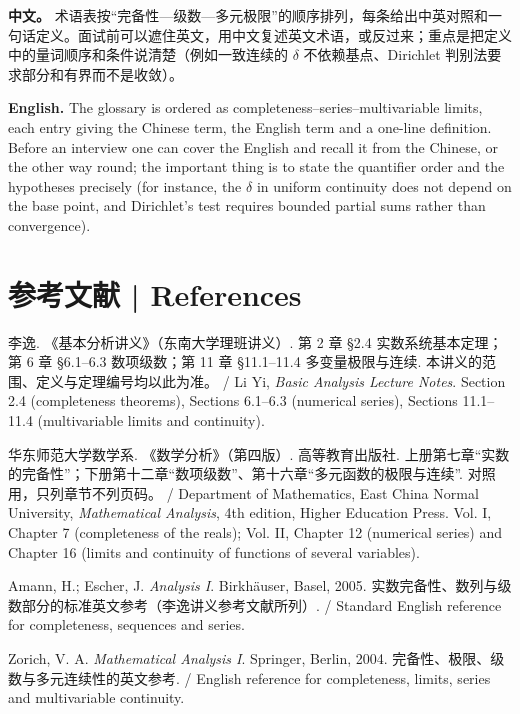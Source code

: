 \documentclass[UTF8,11pt,a4paper]{ctexart}
\newcommand{\APS}[2]{\par\noindent\textbf{中文。} #1\par\noindent\textbf{English.} #2\par\smallskip}
\begin{document}
\endgroup
\APS{术语表按“完备性—级数—多元极限”的顺序排列，每条给出中英对照和一句话定义。面试前可以遮住英文，用中文复述英文术语，或反过来；重点是把定义中的量词顺序和条件说清楚（例如一致连续的 $\delta$ 不依赖基点、Dirichlet 判别法要求部分和有界而不是收敛）。}{The glossary is ordered as completeness--series--multivariable limits, each entry giving the Chinese term, the English term and a one-line definition. Before an interview one can cover the English and recall it from the Chinese, or the other way round; the important thing is to state the quantifier order and the hypotheses precisely (for instance, the $\delta$ in uniform continuity does not depend on the base point, and Dirichlet's test requires bounded partial sums rather than convergence).}

\section*{参考文献 | References}
\begin{enumerate}[label={[\arabic*]},leftmargin=2.2em]
\item 李逸. 《基本分析讲义》（东南大学理班讲义）. 第 2 章 §2.4 实数系统基本定理；第 6 章 §6.1--6.3 数项级数；第 11 章 §11.1--11.4 多变量极限与连续. 本讲义的范围、定义与定理编号均以此为准。 / Li Yi, \emph{Basic Analysis Lecture Notes}. Section 2.4 (completeness theorems), Sections 6.1--6.3 (numerical series), Sections 11.1--11.4 (multivariable limits and continuity).
\item 华东师范大学数学系. 《数学分析》（第四版）. 高等教育出版社. 上册第七章“实数的完备性”；下册第十二章“数项级数”、第十六章“多元函数的极限与连续”. 对照用，只列章节不列页码。 / Department of Mathematics, East China Normal University, \emph{Mathematical Analysis}, 4th edition, Higher Education Press. Vol. I, Chapter 7 (completeness of the reals); Vol. II, Chapter 12 (numerical series) and Chapter 16 (limits and continuity of functions of several variables).
\item Amann, H.; Escher, J. \emph{Analysis I}. Birkh\"auser, Basel, 2005. 实数完备性、数列与级数部分的标准英文参考（李逸讲义参考文献所列）. / Standard English reference for completeness, sequences and series.
\item Zorich, V. A. \emph{Mathematical Analysis I}. Springer, Berlin, 2004. 完备性、极限、级数与多元连续性的英文参考. / English reference for completeness, limits, series and multivariable continuity.
\end{enumerate}
\end{document}
